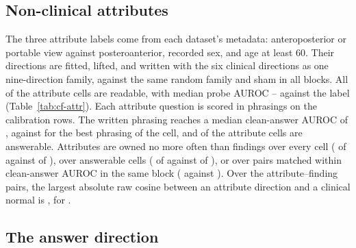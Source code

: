\subsection{Non-clinical attributes}
\label{app:cf-attributes}

The three attribute labels come from each dataset's metadata: anteroposterior or portable view against posteroanterior, recorded sex, and age at least 60. Their directions are fitted, lifted, and written with the six clinical directions as one nine-direction family, against the same random family and sham in all \cfAttrRefBlocks{} blocks. All \cfAttrReadable{} of the \cfAttrChestAttrN{} attribute cells are readable, with median probe AUROC \cfAttrAurocMin{}--\cfAttrAurocMax{} against the label (Table~\ref{tab:cf-attr}). Each attribute question is scored in \cfAttrqPhrasings{} phrasings on the calibration rows. The written phrasing reaches a median clean-answer AUROC of \cfAttrqWrittenAuroc{}, against \cfAttrqSelectedAuroc{} for the best phrasing of the cell, and \cfAttrqCapable{} of the \cfAttrqCells{} attribute cells are answerable. Attributes are owned no more often than findings over every cell (\cfAttrChestAttrOwned{} of \cfAttrChestAttrN{} against \cfAttrChestClinOwned{} of \cfAttrChestClinN{}), over answerable cells (\cfAttrCapAttrOwned{} of \cfAttrCapAttrN{} against \cfAttrCapClinOwned{} of \cfAttrCapClinN{}), or over \cfAttrPairAttrN{} pairs matched within \cfAttrPairWindow{} clean-answer AUROC in the same block (\cfAttrPairAttrOwned{} against \cfAttrPairClinOwned{}). Over the \cfAttrCosPairs{} attribute--finding pairs, the largest absolute raw cosine between an attribute direction and a clinical normal is \cfAttrCosMax{}, for \cfAttrCosPairLabel{}.



\subsection{The answer direction}
\label{app:cf-ansdir}

